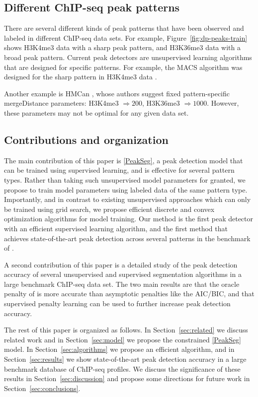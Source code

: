 \documentclass{article}
\begin{document}
\subsection{Different ChIP-seq peak patterns}

There are several different kinds of peak patterns that have been
observed and labeled in different ChIP-seq data sets. For example,
Figure~\ref{fig:dp-peaks-train} shows H3K4me3 data with a sharp peak
pattern, and H3K36me3 data with a broad peak pattern. Current peak
detectors are unsupervised learning algorithms that are designed for
specific patterns. For example, the MACS algorithm was designed for
the sharp pattern in H3K4me3 data \citep{MACS}.

Another example is HMCan \citep{HMCan}, whose authors suggest fixed
pattern-specific mergeDistance parameters: H3K4me3 $\Rightarrow 200$,
H3K36me3 $\Rightarrow 1000$. However, these parameters may not be
optimal for any given data set.

\subsection{Contributions and organization}

The main contribution of this paper is \ref{PeakSeg}, a peak detection
model that can be trained using supervised learning, and is effective
for several pattern types. Rather than taking such unsupervised model
parameters for granted, we propose to train model parameters using
labeled data of the same pattern type. Importantly, and in contrast to
existing unsupervised approaches which can only be trained using grid
search, we propose efficient discrete and convex optimization
algorithms for model training. Our method is the first peak detector
with an efficient supervised learning algorithm, and the first method
that achieves state-of-the-art peak detection across several 
patterns in the benchmark of \citet{hocking2014visual}.

A second contribution of this paper is a detailed study of the peak
detection accuracy of several unsupervised and supervised segmentation
algorithms in a large benchmark ChIP-seq data set. The two main
results are that the oracle penalty of \citet{cleynen2013segmentation}
is more accurate than asymptotic penalties like the AIC/BIC, and that
supervised penalty learning can be used to further increase peak
detection accuracy.

The rest of this paper is organized as follows. In
Section~\ref{sec:related} we discuss related work and in
Section~\ref{sec:model} we propose the constrained \ref{PeakSeg}
model. In Section~\ref{sec:algorithms} we propose an efficient
algorithm, and in Section~\ref{sec:results} we show
state-of-the-art peak detection accuracy in a large benchmark database
of ChIP-seq profiles. We discuss the significance of these results in
Section~\ref{sec:discussion} and propose some directions for future
work in Section~\ref{sec:conclusions}.
\end{document}
